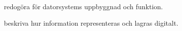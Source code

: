 \item redogöra för datorsystems uppbyggnad och funktion.
\item beskriva hur information representeras och lagras digitalt.
